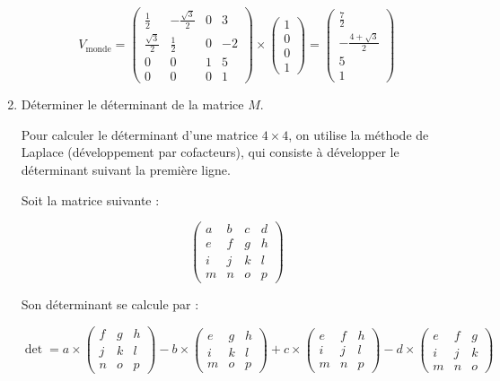 \documentclass[a4paper,12pt]{article}
\begin{document}
\begin{enumerate}
  \begin{equation}
  V_{\text{monde}} = 
    \begin{pmatrix}
    \frac{1}{2} & -\frac{\sqrt{3}}{2} & 0 & 3 \\
    \frac{\sqrt{3}}{2} & \frac{1}{2} & 0 & -2 \\
    0 & 0 & 1 & 5 \\
    0 & 0 & 0 & 1
    \end{pmatrix} 
    \times
    \begin{pmatrix} 1 \\ 0 \\ 0 \\ 1 \end{pmatrix}
    =
    \begin{pmatrix} \frac{7}{2} \\ -\frac{4 +\sqrt{3}}{2} \\ 5 \\ 1 \end{pmatrix}
  \end{equation}

  \item Déterminer le déterminant de la matrice $M$.

Pour calculer le déterminant d’une matrice \(4 \times 4\), on utilise la méthode de Laplace (développement par cofacteurs), qui consiste à développer le déterminant suivant la première ligne.

Soit la matrice suivante :

\[
\begin{pmatrix}
a & b & c & d \\
e & f & g & h \\
i & j & k & l \\
m & n & o & p
\end{pmatrix}
\]

Son déterminant se calcule par :

\[
\det =
a \times 
\begin{pmatrix}
f & g & h \\
j & k & l \\
n & o & p
\end{pmatrix}
- b \times 
\begin{pmatrix}
e & g & h \\
i & k & l \\
m & o & p
\end{pmatrix}
+ c \times 
\begin{pmatrix}
e & f & h \\
i & j & l \\
m & n & p
\end{pmatrix}
- d \times 
\begin{pmatrix}
e & f & g \\
i & j & k \\
m & n & o
\end{pmatrix}
\]


\end{enumerate}
\end{document}
